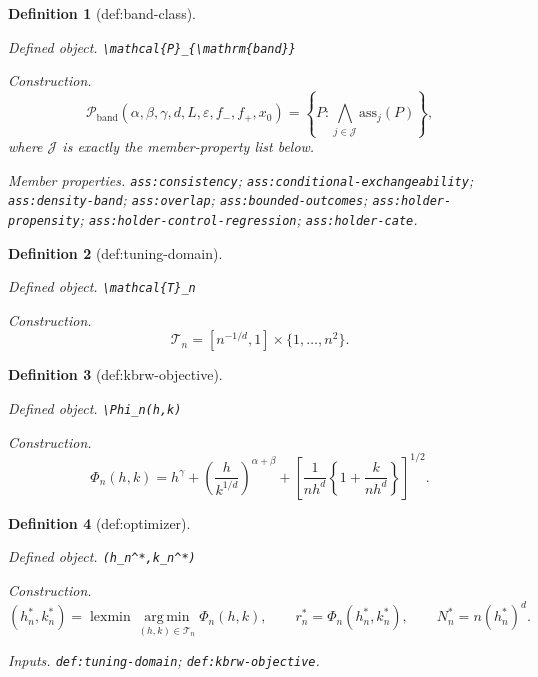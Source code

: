 \documentclass{article}
\newtheorem{definition}{Definition}
\begin{document}
\begin{definition}[def:band-class]\label{def:band-class}
\par\smallskip\noindent\emph{Defined object.} \texttt{\textbackslash{}\allowbreak{}mathcal\{P\}\allowbreak{}\_\allowbreak{}\{\textbackslash{}\allowbreak{}mathrm\{band\}\allowbreak{}\}\allowbreak{}}
\par\smallskip\noindent\emph{Construction.} \[\mathcal{P}_{\mathrm{band}}(\alpha,\beta,\gamma,d,L,\varepsilon,f_{-},f_{+},x_0)=\left\{P:\bigwedge_{j\in\mathcal J}\mathrm{ass}_j(P)\right\},\] where \(\mathcal J\) is exactly the member-property list below.
\par\smallskip\noindent\emph{Member properties.} \texttt{ass:\allowbreak{}consistency}; \texttt{ass:\allowbreak{}conditional-\allowbreak{}exchangeability}; \texttt{ass:\allowbreak{}density-\allowbreak{}band}; \texttt{ass:\allowbreak{}overlap}; \texttt{ass:\allowbreak{}bounded-\allowbreak{}outcomes}; \texttt{ass:\allowbreak{}holder-\allowbreak{}propensity}; \texttt{ass:\allowbreak{}holder-\allowbreak{}control-\allowbreak{}regression}; \texttt{ass:\allowbreak{}holder-\allowbreak{}cate}.
\end{definition}

\begin{definition}[def:tuning-domain]\label{def:tuning-domain}
\par\smallskip\noindent\emph{Defined object.} \texttt{\textbackslash{}\allowbreak{}mathcal\{T\}\allowbreak{}\_\allowbreak{}n}
\par\smallskip\noindent\emph{Construction.} \[\mathcal{T}_n=[n^{-1/d},1]\times\{1,\ldots,n^2\}.\]
\end{definition}

\begin{definition}[def:kbrw-objective]\label{def:kbrw-objective}
\par\smallskip\noindent\emph{Defined object.} \texttt{\textbackslash{}\allowbreak{}Phi\_\allowbreak{}n(h,\allowbreak{}k)}
\par\smallskip\noindent\emph{Construction.} \[\Phi_n(h,k)=h^\gamma+\left(\frac{h}{k^{1/d}}\right)^{\alpha+\beta}+\left[\frac{1}{nh^d}\left\{1+\frac{k}{nh^d}\right\}\right]^{1/2}.\]
\end{definition}

\begin{definition}[def:optimizer]\label{def:optimizer}
\par\smallskip\noindent\emph{Defined object.} \texttt{(h\_\allowbreak{}n\textasciicircum{}*,\allowbreak{}k\_\allowbreak{}n\textasciicircum{}*)}
\par\smallskip\noindent\emph{Construction.} \[(h_n^*,k_n^*)=\operatorname{lexmin}\operatorname*{arg\,min}_{(h,k)\in\mathcal{T}_n}\Phi_n(h,k),\qquad r_n^*=\Phi_n(h_n^*,k_n^*),\qquad N_n^*=n(h_n^*)^d.\]
\par\smallskip\noindent\emph{Inputs.} \texttt{def:\allowbreak{}tuning-\allowbreak{}domain}; \texttt{def:\allowbreak{}kbrw-\allowbreak{}objective}.
\end{definition}
\end{document}
